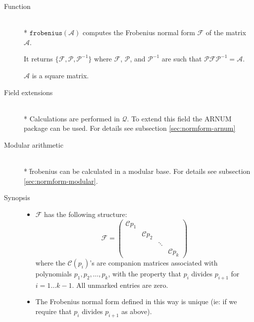 \begin{description}
\item[Function]\mbox{}\\*
$\mathtt{frobenius}(\mathcal{A})$ computes the Frobenius normal form 
$\mathcal{F}$ of the matrix $\mathcal{A}$.

It returns $\{\mathcal{F}, \mathcal{P}, \mathcal{P}^{-1}\}$ where $\mathcal{F}$, 
$\mathcal{P}$, and $\mathcal{P}^{-1}$ are such that $\mathcal{P F P}^{-1} = 
\mathcal{A}$.

$\mathcal{A}$ is a square matrix.

\item[Field extensions]\mbox{}\\*
Calculations are performed in $\mathcal{Q}$. To extend this field the 
{\small ARNUM} package can be used. For details see subsection \ref{sec:normform-arnum}

\item[Modular arithmetic]\mbox{}\\*
%
\f{frobenius} can be calculated in a modular base. For details see 
subsection \ref{sec:normform-modular}.

\item[Synopsis]

\begin{itemize}
\item $\mathcal{F}$ has the following structure:
      \begin{displaymath}
      \mathcal{F} = \begin{pmatrix} \mathcal{C}{p_{1}} &  &  & 
      \\  & \mathcal{C}{p_{2}} &  &  \\  &  & \ddots &  \\  &  &  & 
      \mathcal{C}{p_{k}} \end{pmatrix} 
      \end{displaymath}
      where the $\mathcal{C}({p_{i}})$'s are companion matrices 
      associated with polynomials $p_{1}, p_{2},\ldots, p_{k}$, 
      with the property that $p_{i}$ divides 
      $p_{i+1}$ for $i =1\ldots k-1$. All unmarked entries are 
      zero.

\item The Frobenius normal form defined in this way is unique (ie: if 
      we require that $p_{i}$ divides $p_{i+1}$ as above).
\end{itemize}
 

\end{description}
